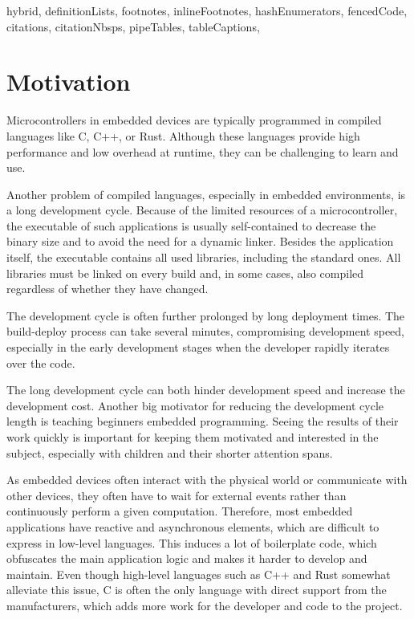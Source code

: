 \begin{markdown*}{%
  hybrid,
  definitionLists,
  footnotes,
  inlineFootnotes,
  hashEnumerators,
  fencedCode,
  citations,
  citationNbsps,
  pipeTables,
  tableCaptions,
}

\chapter{Motivation}

Microcontrollers in embedded devices are typically programmed in compiled languages like C, C++, or Rust. Although these languages provide high performance and low overhead at runtime, they can be challenging to learn and use.

Another problem of compiled languages, especially in embedded environments, is a long development cycle. Because of the limited resources of a microcontroller, the executable of such applications is usually self-contained to decrease the binary size and to avoid the need for a dynamic linker. Besides the application itself, the executable contains all used libraries, including the standard ones. All libraries must be linked on every build and, in some cases, also compiled regardless of whether they have changed.

The development cycle is often further prolonged by long deployment times. The build-deploy process can take several minutes, compromising development speed, especially in the early development stages when the developer rapidly iterates over the code.

The long development cycle can both hinder development speed and increase the development cost. Another big motivator for reducing the development cycle length is teaching beginners embedded programming. Seeing the results of their work quickly is important for keeping them motivated and interested in the subject, especially with children and their shorter attention spans.

As embedded devices often interact with the physical world or communicate with other devices, they often have to wait for external events rather than continuously perform a given computation. Therefore, most embedded applications have reactive and asynchronous elements, which are difficult to express in low-level languages. This induces a lot of boilerplate code, which obfuscates the main application logic and makes it harder to develop and maintain. Even though high-level languages such as C++ and Rust somewhat alleviate this issue, C is often the only language with direct support from the manufacturers, which adds more work for the developer and code to the project.



\end{markdown*}
